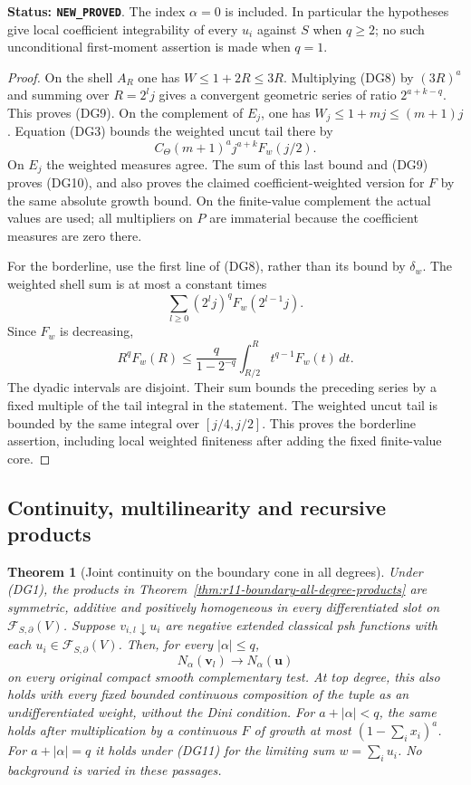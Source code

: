 \documentclass[11pt,a4paper]{article}
\numberwithin{equation}{section}
\newtheorem{theorem}{Theorem}[section]
\theoremstyle{definition}
\theoremstyle{remark}
\begin{document}
\noindent\textbf{Status: \texttt{NEW\_PROVED}}.
The index $\alpha=0$ is included. In particular the hypotheses
give local coefficient integrability of every $u_i$ against $S$
when $q\geq2$; no such unconditional first-moment assertion is
made when $q=1$.

\begin{proof}
On the shell $A_R$ one has $W\leq1+2R\leq3R$.
Multiplying (DG8) by $(3R)^a$ and summing over $R=2^lj$
gives a convergent geometric series of ratio $2^{a+k-q}$.
This proves (DG9). On the complement of $E_j$, one has
$W_j\leq1+mj\leq(m+1)j$. Equation (DG3) bounds the weighted
uncut tail there by
\[
                 C_\Theta(m+1)^a j^{a+k}F_w(j/2).
\]
On $E_j$ the weighted measures agree. The sum of this last
bound and (DG9) proves (DG10), and also proves the claimed
coefficient-weighted version for $F$ by the same absolute
growth bound. On the finite-value complement the actual values
are used; all multipliers on $P$ are immaterial because the
coefficient measures are zero there.

For the borderline, use the first line of (DG8), rather than
its bound by $\delta_w$. The weighted shell sum is at most a
constant times
\[
                         \sum_{l\geq0}(2^lj)^qF_w(2^{l-1}j).
\]
Since $F_w$ is decreasing,
\[
 R^qF_w(R)
    \leq \frac{q}{1-2^{-q}}
                     \int_{R/2}^{R}t^{q-1}F_w(t)\,dt .
\]
The dyadic intervals are disjoint. Their sum bounds the preceding
series by a fixed multiple of the tail integral in the statement.
The weighted uncut tail is bounded by the same integral over
$[j/4,j/2]$. This proves the borderline assertion, including
local weighted finiteness after adding the fixed finite-value core.
\end{proof}

\subsection{Continuity, multilinearity and recursive products}

\begin{theorem}[Joint continuity on the boundary cone in all degrees]
\label{thm:r11-boundary-all-degree-continuity}
Under (DG1), the products in
Theorem~\ref{thm:r11-boundary-all-degree-products} are symmetric,
additive and positively homogeneous in every differentiated slot
on $\mathcal F_{S,\partial}(V)$.
Suppose $v_{i,l}\downarrow u_i$ are negative extended classical
psh functions with each $u_i\in\mathcal F_{S,\partial}(V)$.
Then, for every $|\alpha|\leq q$,
\[
                    N_\alpha(\mathbf v_l)\longrightarrow
                                      N_\alpha(\mathbf u)
 \tag{DG12}
\]
on every original compact smooth complementary test.
At top degree, this also holds with every fixed bounded continuous
composition of the tuple as an undifferentiated weight, without
the Dini condition.
For $a+|\alpha|<q$, the same holds after multiplication by a
continuous $F$ of growth at most $(1-\sum_i x_i)^a$.
For $a+|\alpha|=q$ it holds under (DG11) for the limiting
sum $w=\sum_i u_i$. No background is varied in these passages.
\end{theorem}
\end{document}
